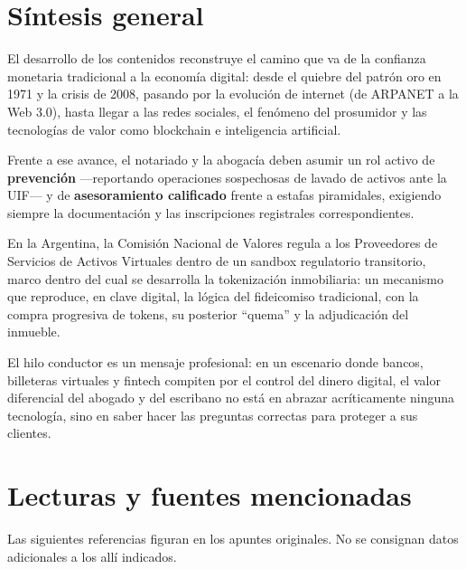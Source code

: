 \documentclass[12pt,oneside]{book}
\begin{document}
\chapter*{Síntesis general}

El desarrollo de los contenidos reconstruye el camino que va de la confianza monetaria tradicional a la economía digital: desde el quiebre del patrón oro en 1971 y la crisis de 2008, pasando por la evolución de internet (de ARPANET a la Web 3.0), hasta llegar a las redes sociales, el fenómeno del prosumidor y las tecnologías de valor como blockchain e inteligencia artificial.

Frente a ese avance, el notariado y la abogacía deben asumir un rol activo de \textbf{prevención} ---reportando operaciones sospechosas de lavado de activos ante la UIF--- y de \textbf{asesoramiento calificado} frente a estafas piramidales, exigiendo siempre la documentación y las inscripciones registrales correspondientes.

En la Argentina, la Comisión Nacional de Valores regula a los Proveedores de Servicios de Activos Virtuales dentro de un sandbox regulatorio transitorio, marco dentro del cual se desarrolla la tokenización inmobiliaria: un mecanismo que reproduce, en clave digital, la lógica del fideicomiso tradicional, con la compra progresiva de tokens, su posterior ``quema'' y la adjudicación del inmueble.

El hilo conductor es un mensaje profesional: en un escenario donde bancos, billeteras virtuales y fintech compiten por el control del dinero digital, el valor diferencial del abogado y del escribano no está en abrazar acríticamente ninguna tecnología, sino en saber hacer las preguntas correctas para proteger a sus clientes.

\clearpage
{}
{}
\chapter*{Lecturas y fuentes mencionadas}

Las siguientes referencias figuran en los apuntes originales. No se consignan datos adicionales a los allí indicados.
\end{document}
